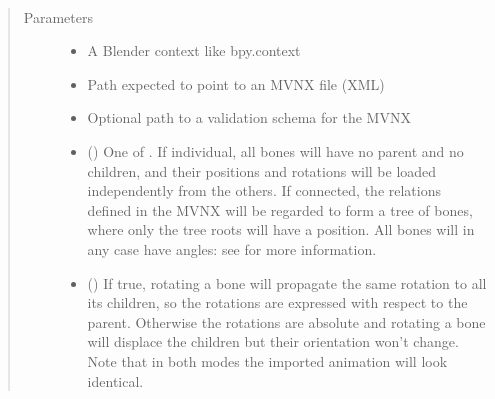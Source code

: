 \documentclass[letterpaper,10pt,english,openany,oneside]{sphinxmanual}
\begin{document}

\begin{fulllineitems}
\label{\detokenize{io_anim_mvnx:io_anim_mvnx.mvnx_import.load_mvnx_into_blender}}~\begin{quote}\begin{description}
\item[{Parameters}] \leavevmode\begin{itemize}
\item {} 
 \textendash{} A Blender context like bpy.context

\item {} 
 \textendash{} Path expected to point to an MVNX file (XML)

\item {} 
 \textendash{} Optional path to a validation schema for the MVNX

\item {} 
 () \textendash{} One of . If
individual, all bones will have no parent and no children, and their
positions and rotations will be loaded independently from the others.
If connected, the relations defined in the MVNX will be regarded to form
a tree of bones, where only the tree roots will have a position. All
bones will in any case have angles: see  for more
information.

\item {} 
 () \textendash{} If true, rotating a bone will propagate
the same rotation to all its children, so the rotations are expressed
with respect to the parent. Otherwise the rotations are absolute and
rotating a bone will displace the children but their orientation won’t
change. Note that in both modes the imported animation will look
identical.


\end{itemize}
\end{description}
\end{quote}
\end{fulllineitems}
\end{document}
